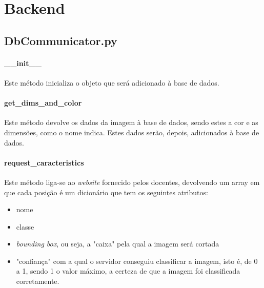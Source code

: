 \documentclass{report}
\begin{document}
\section{Backend}
\subsection{DbCommunicator.py}
\paragraph{\_\_init\_\_}
Este método inicializa o objeto que será adicionado à base de dados.

\paragraph{get\_dims\_and\_color}
Este método devolve os dados da imagem à base de dados, sendo estes a cor e as dimensões, como o nome indica. Estes dados serão, depois, adicionados à base de dados.

\paragraph{request\_caracteristics}
Este método liga-se ao \textit{website} fornecido pelos docentes, devolvendo um array em que cada posição é um dicionário que tem os seguintes atributos:
\begin{itemize}
\item nome
\item classe
\item \textit{bounding box}, ou seja, a "caixa" pela qual a imagem será cortada 
\item "confiança" com a qual o servidor conseguiu classificar a imagem, isto é, de 0 a 1, sendo 1 o valor máximo, a certeza de que a imagem foi classificada corretamente. 
\end{itemize}
\end{document}
